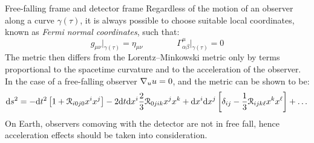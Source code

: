 \begin{observation}{Free-falling frame and detector frame}{}
  Regardless of the motion of an observer along a curve $ \gamma(\tau) $, it is always possible to choose suitable local coordinates, known as \emph{Fermi normal coordinates}, such that:
  \begin{equation*}
    g_{\mu \nu} \vert_{\gamma(\tau)} = \eta_{\mu \nu}
    \qquad \qquad
    \Gamma^\mu_{\alpha \beta} \vert_{\gamma(\tau)} = 0
  \end{equation*}
  The metric then differs from the Lorentz--Minkowski metric only by terms proportional to the spacetime curvature and to the acceleration of the observer. In the case of a free-falling observer $ \nabla_u u = 0 $, and the metric can be shown to be:
  \begin{equation*}
    \mathrm{d} s^2 = - \mathrm{d} t^2 \left[ 1 + \EuScript{R}_{i0j0} x^i x^j \right] - 2 \mathrm{d} t \mathrm{d} x^i \frac{2}{3} \EuScript{R}_{0jik} x^j x^k + \mathrm{d} x^i \mathrm{d} x^j \left[ \delta_{ij} - \frac{1}{3} \EuScript{R}_{ijk\ell} x^k x^\ell \right] + \dots
  \end{equation*}
  On Earth, observers comoving with the detector are not in free fall, hence acceleration effects should be taken into consideration.
\end{observation}

